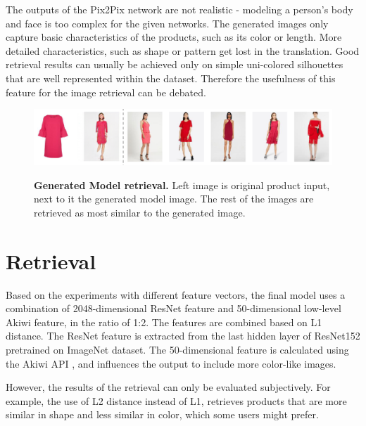 \documentclass[12pt]{report}
\begin{document}
The outputs of the Pix2Pix network are not realistic - modeling a person's body and face is too complex for the given networks. The generated images only capture basic characteristics of the products, such as its color or length. More detailed characteristics, such as shape or pattern get lost in the translation. Good retrieval results can usually be achieved only on simple uni-colored silhouettes that are well represented within the dataset. Therefore the usefulness of this feature for the image retrieval can be debated. 

\begin{figure}[h]
\centering
{\includegraphics[width=\linewidth]{05_results/model_retrieval}}
\caption{\label{fig:model_retrieval} \textbf{Generated Model retrieval.} Left image is original product input, next to it the generated model image. The rest of the images are retrieved as most similar to the generated image.}
\end{figure}

\section{Retrieval}
Based on the experiments with different feature vectors, the final model uses a combination of 2048-dimensional ResNet feature and 50-dimensional low-level Akiwi feature, in the ratio of 1:2. The features are combined based on L1 distance. The ResNet feature is extracted from the last hidden layer of ResNet152 pretrained on ImageNet dataset. The 50-dimensional feature is calculated using the Akiwi API \cite{sonnenberg_akiwi_nodate}, and influences the output to include more color-like images.

However, the results of the retrieval can only be evaluated subjectively. For example, the use of L2 distance instead of L1, retrieves products that are more similar in shape and less similar in color, which some users might prefer.
\end{document}
